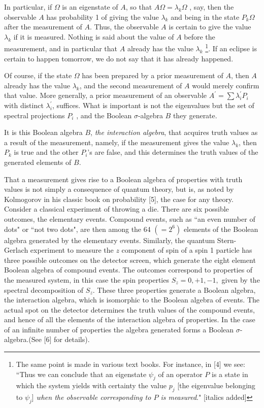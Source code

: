 \documentclass{article}
\begin{document}
In particular, if $\Omega$  is an eigenstate of $A$, so that $A \Omega = \lambda_k \Omega$ , say, then the observable $A$ has probability 1 of giving the value $\lambda_k$  and being in the state $P_k\Omega$  after the measurement of $A$. Thus, the observable $A$ is certain to give the value $\lambda_k$ if it is measured. Nothing is said about the value of $A$ before the measurement, and in particular that $A$ already has the value $\lambda_k$ \footnote{The same point is made in various text books. For instance, in [4] we see: ``Thus we can conclude that an eigenstate $\psi_j$ of an operator $P$ is a state in which the system yields with certainty the value $p_j$ [the eigenvalue belonging to $\psi_j$] \textit{when the observable corresponding to $P$ is measured}."       [italics added]}. If an eclipse is certain to happen tomorrow, we do not say that it has already happened.

Of course, if the state $\Omega$ has been prepared by a prior measurement of $A$, then $A$ already has the value $\lambda_k$, and the second measurement of $A$ would merely confirm that value. More generally, a prior measurement of an observable $A^\prime = \sum \lambda^\prime_i P_i$ with distinct $\lambda^\prime_i$, suffices. What is important is not the eigenvalues but the set of spectral projections $P_i$ , and the Boolean $\sigma$-algebra $B$ they generate.        

It is this Boolean algebra $B$, \textit{the interaction algebra}, that acquires truth values as a result of the measurement, namely, if the measurement gives the value $\lambda_k$, then $P_k$ is true and the other $P_i$'s are false, and this determines the truth values of the generated elements of $B$. 

That a measurement gives rise to a Boolean algebra of properties with truth values is not simply a consequence of quantum theory, but is, as noted by Kolmogorov in his classic book on probability [5], the case for any theory. Consider a classical experiment of throwing a die. There are six possible outcomes, the elementary events. Compound events, such as ``an even number of dots" or ``not two dots", are then among the 64 $(= 2^6)$ elements of the Boolean algebra generated by the elementary events. Similarly, the quantum Stern-Gerlach experiment to measure the $z$ component of spin of a spin 1 particle has three possible outcomes on the detector screen, which generate the eight element Boolean algebra of compound events. The outcomes correspond to properties of the measured system, in this case the spin properties $S_z = 0,+1,-1,$ given by the spectral decomposition of $S_z$.  These three properties generate a Boolean algebra, the interaction algebra, which is isomorphic to the Boolean algebra of events.  The actual spot on the detector determines the truth values of the compound events, and hence of all the elements of the interaction algebra of properties. In the case of an infinite number of properties the algebra generated forms a Boolean $\sigma$-algebra.(See [6] for details).
\end{document}
